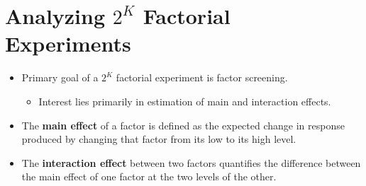 \section{Analyzing \texorpdfstring{$ 2^K $}{2K} Factorial Experiments}
\begin{itemize}
      \item Primary goal of a $2^K$ factorial experiment is factor screening.
            \begin{itemize}
                  \item Interest lies primarily in estimation of main and interaction effects.
            \end{itemize}
\end{itemize}
\begin{itemize}[*]
      \item The \textbf{main effect} of a factor is defined as the expected change in response produced by changing that factor from
            its low to its high level.
      \item The \textbf{interaction effect} between two factors quantifies the difference between the main effect of one
            factor at the two levels of the other.
\end{itemize}
